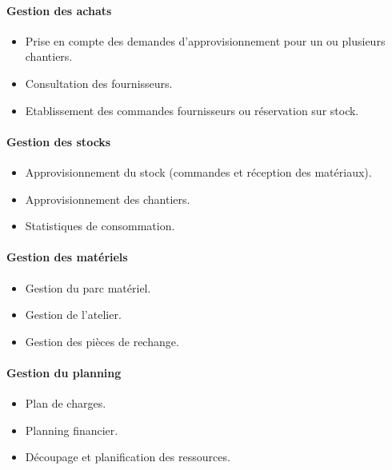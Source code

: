 				\paragraph{Gestion des achats}
				\newline
				\begin{itemize}
				    \item Prise en compte des demandes d'approvisionnement pour un ou plusieurs chantiers.
				    \item Consultation des fournisseurs.
				    \item Etablissement des commandes fournisseurs ou réservation sur stock.
				\end{itemize}
				
				\paragraph{Gestion des stocks}
				\newline
				\begin{itemize}
				    \item Approvisionnement du stock (commandes et réception des matériaux).
				    \item Approvisionnement des chantiers.
				    \item Statistiques de consommation.
				\end{itemize}
				
				\paragraph{Gestion des matériels}
				\newline
				\begin{itemize}
				    \item Gestion du parc matériel.
				    \item Gestion de l'atelier.
				    \item Gestion des pièces de rechange.
				\end{itemize}
				
				\paragraph{Gestion du planning}
				\newline
				\begin{itemize}
				    \item Plan de charges.
				    \item Planning financier.
				    \item Découpage et planification des ressources.
				\end{itemize}
				
